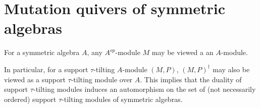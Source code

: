 \documentclass[]{article}
\begin{document}
\section{Mutation quivers of symmetric algebras}
For a symmetric algebra $A$, any $A^{op}$-module $M$ may be viewed a an $A$-module. 

In particular, for a support $\tau$-tilting $A$-module $(M,P)$, $(M,P)^\dagger$ may also be viewed as a support $\tau$-tilting module over $A$. This implies that the duality of support $\tau$-tilting modules induces an automorphism on the set of (not necessarily ordered) support $\tau$-tilting modules of symmetric algebras.
\end{document}
